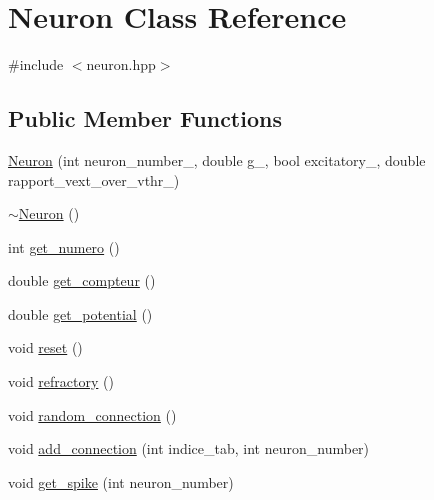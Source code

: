 \hypertarget{class_neuron}{}\section{Neuron Class Reference}
\label{class_neuron}


{\ttfamily \#include $<$neuron.\+hpp$>$}

\subsection*{Public Member Functions}
\begin{DoxyCompactItemize}
\item 
\hyperlink{class_neuron_ab15c755e86f858840a6e3799ff5bc7aa}{Neuron} (int neuron\+\_\+number\+\_\+, double g\+\_\+, bool excitatory\+\_\+, double rapport\+\_\+vext\+\_\+over\+\_\+vthr\+\_\+)
\item 
\hyperlink{class_neuron_a94a250ce7e167760e593979b899745b1}{$\sim$\+Neuron} ()
\item 
int \hyperlink{class_neuron_a34b44bcd44cfd9e04831e307b32a605e}{get\+\_\+numero} ()
\item 
double \hyperlink{class_neuron_a601c49ff0ef55337e90b0c163054e1d7}{get\+\_\+compteur} ()
\item 
double \hyperlink{class_neuron_ac7f8ab271cb1b315206ff26c440d7eee}{get\+\_\+potential} ()
\item 
void \hyperlink{class_neuron_a6817fc5bf2128150b41b65e74f018408}{reset} ()
\item 
void \hyperlink{class_neuron_ac35d991a6113da31ad2961ca28242722}{refractory} ()
\item 
void \hyperlink{class_neuron_ad4e598fd98e9119290a3ee1ac0ef8289}{random\+\_\+connection} ()
\item 
void \hyperlink{class_neuron_a1fb776caee1ae8f839233f598c090e70}{add\+\_\+connection} (int indice\+\_\+tab, int neuron\+\_\+number)
\item 
void \hyperlink{class_neuron_aa3f598d0bfdd7de26a4efedbfeb55885}{get\+\_\+spike} (int neuron\+\_\+number)
\end{DoxyCompactItemize}
